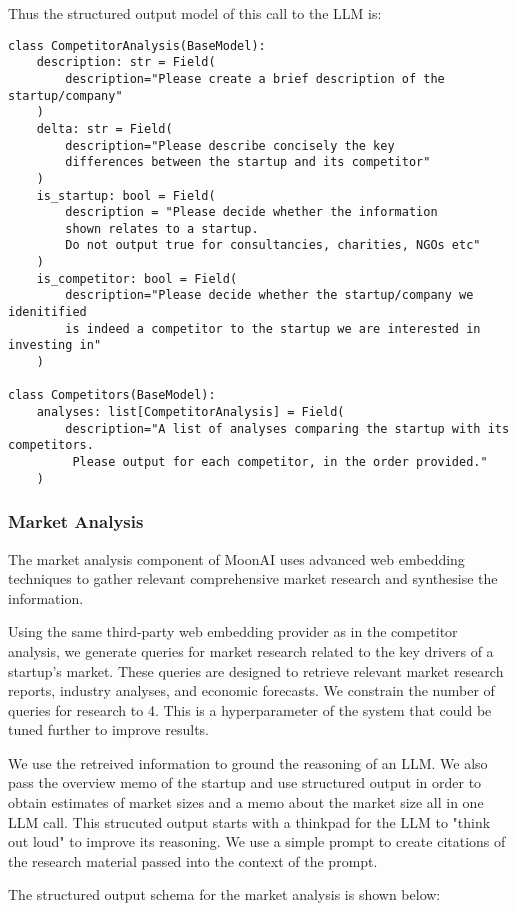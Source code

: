 \documentclass[a4paper, oneside]{discothesis}
\begin{document}
Thus the structured output model of this call to the LLM is:

\begin{verbatim}
class CompetitorAnalysis(BaseModel):
    description: str = Field(
        description="Please create a brief description of the startup/company"
    )
    delta: str = Field(
        description="Please describe concisely the key 
        differences between the startup and its competitor"
    )
    is_startup: bool = Field(
        description = "Please decide whether the information 
        shown relates to a startup. 
        Do not output true for consultancies, charities, NGOs etc"
    )
    is_competitor: bool = Field(
        description="Please decide whether the startup/company we idenitified 
        is indeed a competitor to the startup we are interested in investing in"
    )

class Competitors(BaseModel):
    analyses: list[CompetitorAnalysis] = Field(
        description="A list of analyses comparing the startup with its competitors.
         Please output for each competitor, in the order provided."
    )
\end{verbatim}


\subsubsection{Market Analysis}
The market analysis component of MoonAI uses advanced web embedding techniques to gather relevant comprehensive market research and synthesise the information. 

Using the same third-party web embedding provider as in the competitor analysis, we generate queries for market research related to the key drivers of a startup's market. These queries are designed to retrieve relevant market research reports, industry analyses, and economic forecasts. We constrain the number of queries for research to 4. This is a hyperparameter of the system that could be tuned further to improve results. 

We use the retreived information to ground the reasoning of an LLM. We also pass the overview memo of the startup and use structured output in order to obtain estimates of market sizes and a memo about the market size all in one LLM call. This strucuted output starts with a thinkpad for the LLM to "think out loud" to improve its reasoning. We use a simple prompt to create citations of the research material passed into the context of the prompt. 

The structured output schema for the market analysis is shown below:
\end{document}
